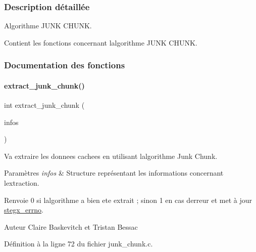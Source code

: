 \subsubsection{Description détaillée}
Algorithme J\+U\+NK C\+H\+U\+NK. 

Contient les fonctions concernant l\textquotesingle{}algorithme J\+U\+NK C\+H\+U\+NK. 

\subsubsection{Documentation des fonctions}
\mbox{\label{a00026_ad04f5216bd1375440a90d0c51a4ba590}} 
\paragraph{\texorpdfstring{extract\+\_\+junk\+\_\+chunk()}{extract\_junk\_chunk()}}
{\footnotesize\ttfamily int extract\+\_\+junk\+\_\+chunk (\begin{DoxyParamCaption}\item[{\hyperlink{a00008_aa8ca908d92fb5bdd3c0a9e1f58b2cf03}{info\+\_\+s} $\ast$}]{infos }\end{DoxyParamCaption})}



Va extraire les donnees cachees en utilisant l\textquotesingle{}algorithme Junk Chunk. 


\begin{DoxyParams}{Paramètres}
{\em infos} & Structure représentant les informations concernant l\textquotesingle{}extraction. \\
\hline
\end{DoxyParams}
\begin{DoxyReturn}{Renvoie}
0 si l\textquotesingle{}algorithme a bien ete extrait ; sinon 1 en cas d\textquotesingle{}erreur et met à jour \hyperlink{a00062_a5ec48ccdfbe19fe23855818f8556abec}{stegx\+\_\+errno}. 
\end{DoxyReturn}
\begin{DoxyAuthor}{Auteur}
Claire Baskevitch et Tristan Bessac 
\end{DoxyAuthor}


Définition à la ligne 72 du fichier junk\+\_\+chunk.\+c.

